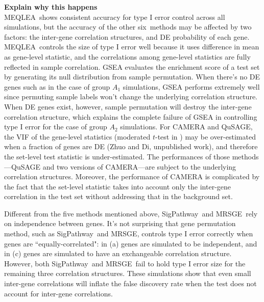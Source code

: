 \documentclass[useAMS,usenatbib, galley]{biom}
\newcommand{\OurMethod}{MEQLEA}
\newcommand{\HowmanyTest}{six}
\newcommand{\aaCase}{a}
\newcommand{\aCase}{b}
\newcommand{\cCase}{c}
\newcommand{\eCase}{d}
\newcommand{\fCase}{e}
\newcommand{\gent}{SigPathway}
\newcommand{\gen}{geneSetTest}
\newcommand{\genr}{MRSGE}
\newcommand{\thepapertobefinished}{Zhuo and Di, unpublished work}
\begin{document}
	\textbf{Explain why this happens}\\
	\OurMethod~shows consistent accuracy for type I error control across all simulations, but the accuracy of the other \HowmanyTest~methods may be affected by two factors: the inter-gene correlation structures, and DE probability of each gene. \OurMethod~controls the size of type I error well because it uses difference in mean as gene-level statistic, and the correlations among gene-level statistics are fully reflected in sample correlation. GSEA evaluates the enrichment score of a test set by generating its null distribution from sample permutation. When there's no DE genes such as in the case of group $A_1$ simulations, GSEA performs extremely well since permuting sample labels won't change the underlying correlation structure. When DE genes exist, however, sample permutation will destroy the inter-gene correlation structure, which explains the complete failure of GSEA in controlling type I error for the case of group $A_2$ simulations. For CAMERA and QuSAGE, the VIF of the gene-level statistics (moderated $t$-test in \cite{wu2012camera}) may be over-estimated when a fraction of genes are DE (\thepapertobefinished), and therefore the set-level test statistic is under-estimated. The performances of those methods---QuSAGE and two versions of CAMERA---are subject to the underlying correlation structures. Moreover, the performance of CAMERA is complicated by the fact that the set-level statistic takes into account only the inter-gene correlation in the test set without addressing that in the background set.
	
	Different from the five methods mentioned above, \gent~and \genr~rely on independence between genes. It's not surprising that gene permutation method, such as \gent~and \genr, controls type I error correctly when genes are ``equally-correlated": in (\aaCase) genes are simulated to be independent, and in (\cCase) genes are simulated to have an exchangeable correlation structure. However, both \gent~and \genr~fail to hold type I error size for the remaining three correlation structures. These simulations show that even small inter-gene correlations will inflate the false discovery rate when the test does not account for inter-gene correlations.  
	
	
\end{document}
